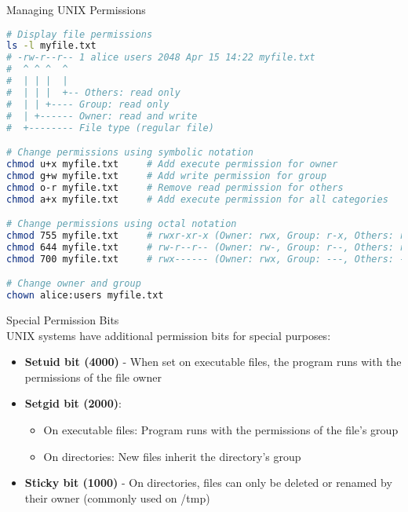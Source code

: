 \begin{code}{Managing UNIX Permissions}\\
\begin{lstlisting}[language=bash, style=basesmol]
# Display file permissions
ls -l myfile.txt
# -rw-r--r-- 1 alice users 2048 Apr 15 14:22 myfile.txt
#  ^ ^ ^  ^
#  | | |  |
#  | | |  +-- Others: read only
#  | | +---- Group: read only
#  | +------ Owner: read and write
#  +-------- File type (regular file)

# Change permissions using symbolic notation
chmod u+x myfile.txt     # Add execute permission for owner
chmod g+w myfile.txt     # Add write permission for group
chmod o-r myfile.txt     # Remove read permission for others
chmod a+x myfile.txt     # Add execute permission for all categories

# Change permissions using octal notation
chmod 755 myfile.txt     # rwxr-xr-x (Owner: rwx, Group: r-x, Others: r-x)
chmod 644 myfile.txt     # rw-r--r-- (Owner: rw-, Group: r--, Others: r--)
chmod 700 myfile.txt     # rwx------ (Owner: rwx, Group: ---, Others: ---)

# Change owner and group
chown alice:users myfile.txt
\end{lstlisting}
\end{code}

\begin{concept}{Special Permission Bits}\\
UNIX systems have additional permission bits for special purposes:
\begin{itemize}
    \item \textbf{Setuid bit (4000)} - When set on executable files, the program runs with the permissions of the file owner
    \item \textbf{Setgid bit (2000)}:
    \begin{itemize}
        \item On executable files: Program runs with the permissions of the file's group
        \item On directories: New files inherit the directory's group
    \end{itemize}
    \item \textbf{Sticky bit (1000)} - On directories, files can only be deleted or renamed by their owner (commonly used on /tmp)
\end{itemize}
\end{concept}

